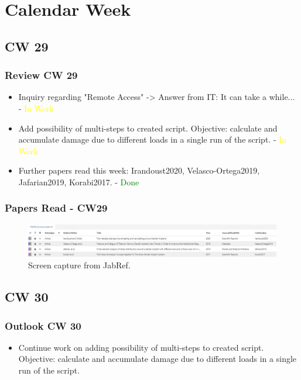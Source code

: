 \section{Calendar Week}
\subsection{CW 29}
\begin{frame}
  \frametitle{Review CW 29}
	\begin{itemize}
		\item Inquiry regarding "Remote Access" -> Answer from IT: It can take a while... - \textcolor{yellow}{In Work} 
		\item Add possibility of multi-steps to created script. Objective: calculate and accumulate damage due to different loads in a single run of the script. - \textcolor{yellow}{In Work} 
		\item Further papers read this week: Irandoust2020, Velasco-Ortega2019, Jafarian2019, Korabi2017. - \textcolor{green}{Done}
	\end{itemize}
\end{frame}

\begin{frame}
	\frametitle{Papers Read - CW29}
	\begin{figure}
	\includegraphics[width=1.0\textwidth]{pictures/CW29_1}
	\caption{Screen capture from JabRef.}
	\end{figure}
\end{frame}

\subsection{CW 30}
\begin{frame}
  \frametitle{Outlook CW 30}
	\begin{itemize}
		\item Continue work on adding possibility of multi-steps to created script. Objective: calculate and accumulate damage due to different loads in a single run of the script.
	\end{itemize}
\end{frame}

